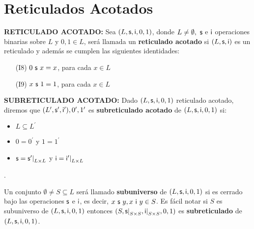 \section{Reticulados Acotados}

  \PN \textbf{RETICULADO ACOTADO:} Sea $(L, \mathsf{s}, \mathsf{i}, 0, 1)$, donde $L \neq \emptyset, \ \mathsf{s}$ e $\mathsf{i}$ operaciones
  binarias sobre $L$ y $0, 1 \in L$, será llamada un \textbf{reticulado acotado} si $(L, \mathsf{s}, \mathsf{i})$ es un reticulado y
  además se cumplen las siguientes identidades:
  \begin{enumerate}
    \item[(I8)] $0 \ \mathsf{s} \ x = x$, para cada $x \in L$
    \item[(I9)] $x \ \mathsf{s} \ 1 = 1$, para cada $x \in L$
  \end{enumerate}

  \vspace{3mm}
  \PN \textbf{SUBRETICULADO ACOTADO:} Dado $(L, \mathsf{s}, \mathsf{i}, 0, 1)$ reticulado acotado, diremos que $(L^{\prime},
  \mathsf{s}^{\prime}, \mathsf{i}^{\prime}), 0^{\prime}, 1^{\prime}$ es \textbf{subreticulado acotado} de $(L, \mathsf{s}, \mathsf{i}, 0, 1)$ si:
  \begin{itemize}
    \item $L \subseteq L^{\prime}$
    \item $0 = 0^{\prime}$ y $1 = 1^{\prime}$
    \item $\mathsf{s} = \mathsf{s}^{\prime}\mathrm{\mid}_{L \times L}$ y $\mathsf{i} = \mathsf{i}^{\prime}\mathrm{\mid}_{L \times L}$
  \end{itemize}.

  \PN Un conjunto $\emptyset \neq S \subseteq L$ será llamado \textbf{subuniverso} de $(L, \mathsf{s}, \mathsf{i}, 0, 1)$ si es
  cerrado bajo las operaciones $\mathsf{s}$ e $\mathsf{i}$, es decir, $x \ \mathsf{s} \ y, x \ \mathsf{i} \ y \in S$. Es fácil notar si $S$ es
  subuniverso de $(L, \mathsf{s}, \mathsf{i}, 0, 1)$ entonces $(S, \mathsf{s}\mathrm{\mid}_{S \times S}, \mathsf{i}\mathrm{\mid}_{S \times S}, 0,
  1)$ es \textbf{subreticulado} de $(L, \mathsf{s}, \mathsf{i}, 0, 1)$.

